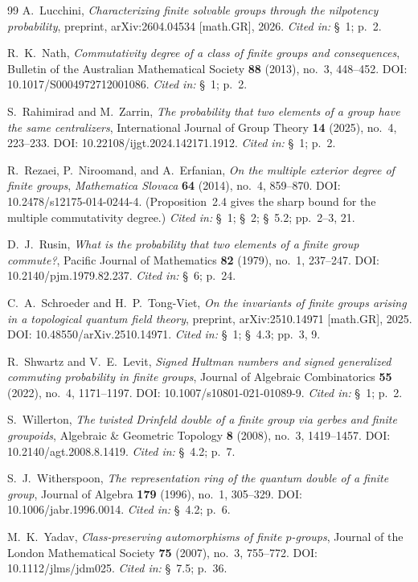 \documentclass[11pt]{article}
\theoremstyle{definition}
\theoremstyle{remark}
\theoremstyle{definition}
\theoremstyle{plain}
\newcommand{\citedin}[1]{\newblock \emph{Cited in:} #1.}
\begin{document}
\begin{thebibliography}{99}
A.~Lucchini,
\newblock \emph{Characterizing finite solvable groups through the nilpotency probability},
\newblock preprint, arXiv:2604.04534 [math.GR], 2026.
\citedin{\S~1; p.~2}

R.~K.~Nath,
\newblock \emph{Commutativity degree of a class of finite groups and consequences},
\newblock Bulletin of the Australian Mathematical Society \textbf{88} (2013), no.~3, 448--452.
\newblock DOI: 10.1017/S0004972712001086.
\citedin{\S~1; p.~2}

S.~Rahimirad and M.~Zarrin,
\newblock \emph{The probability that two elements of a group have the same centralizers},
\newblock International Journal of Group Theory \textbf{14} (2025), no.~4, 223--233.
\newblock DOI: 10.22108/ijgt.2024.142171.1912.
\citedin{\S~1; p.~2}

R.~Rezaei, P.~Niroomand, and A.~Erfanian,
\newblock \emph{On the multiple exterior degree of finite groups},
\newblock \emph{Mathematica Slovaca} \textbf{64} (2014), no.~4, 859--870.
\newblock DOI: 10.2478/s12175-014-0244-4.
\newblock (Proposition~2.4 gives the sharp bound for the multiple commutativity degree.)
\citedin{\S~1; \S~2; \S~5.2; pp.~2--3, 21}

D.~J.~Rusin,
\newblock \emph{What is the probability that two elements of a finite group commute?},
\newblock Pacific Journal of Mathematics \textbf{82} (1979), no.~1, 237--247.
\newblock DOI: 10.2140/pjm.1979.82.237.
\citedin{\S~6; p.~24}

C.~A.~Schroeder and H.~P.~Tong-Viet,
\newblock \emph{On the invariants of finite groups arising in a topological quantum field theory},
\newblock preprint, arXiv:2510.14971 [math.GR], 2025.
\newblock DOI: 10.48550/arXiv.2510.14971.
\citedin{\S~1; \S~4.3; pp.~3, 9}

R.~Shwartz and V.~E.~Levit,
\newblock \emph{Signed Hultman numbers and signed generalized commuting probability in finite groups},
\newblock Journal of Algebraic Combinatorics \textbf{55} (2022), no.~4, 1171--1197.
\newblock DOI: 10.1007/s10801-021-01089-9.
\citedin{\S~1; p.~2}

S.~Willerton,
\newblock \emph{The twisted Drinfeld double of a finite group via gerbes and finite groupoids},
\newblock Algebraic \& Geometric Topology \textbf{8} (2008), no.~3, 1419--1457.
\newblock DOI: 10.2140/agt.2008.8.1419.
\citedin{\S~4.2; p.~7}

S.~J.~Witherspoon,
\newblock \emph{The representation ring of the quantum double of a finite group},
\newblock Journal of Algebra \textbf{179} (1996), no.~1, 305--329.
\newblock DOI: 10.1006/jabr.1996.0014.
\citedin{\S~4.2; p.~6}

M.~K.~Yadav,
\newblock \emph{Class-preserving automorphisms of finite $p$-groups},
\newblock Journal of the London Mathematical Society \textbf{75} (2007), no.~3, 755--772.
\newblock DOI: 10.1112/jlms/jdm025.
\citedin{\S~7.5; p.~36}
\end{thebibliography}
\end{document}
